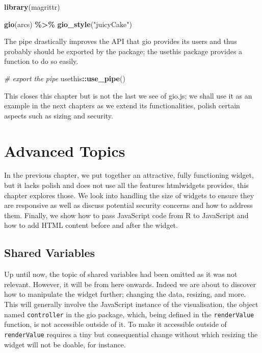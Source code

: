 \documentclass[
  10pt,
]{krantz}
\makeatletter
\newenvironment{Shaded}{\begin{snugshade}}{\end{snugshade}}
\newcommand{\CommentTok}[1]{\textcolor[rgb]{0.37,0.37,0.37}{\textit{#1}}}
\newcommand{\KeywordTok}[1]{\textcolor[rgb]{0.27,0.27,0.27}{\textbf{#1}}}
\newcommand{\NormalTok}[1]{#1}
\newcommand{\OperatorTok}[1]{\textcolor[rgb]{0.43,0.43,0.43}{\textbf{#1}}}
\newcommand{\StringTok}[1]{\textcolor[rgb]{0.5,0.5,0.5}{#1}}
\newenvironment{kframe}{%
\medskip{}
\setlength{\fboxsep}{.8em}
 \def\at@end@of@kframe{}%
 \ifinner\ifhmode%
  \def\at@end@of@kframe{\end{minipage}}%
  \begin{minipage}{\columnwidth}%
 \fi\fi%
 \def\FrameCommand##1{\hskip\@totalleftmargin \hskip-\fboxsep
 \colorbox{shadecolor}{##1}\hskip-\fboxsep
     \hskip-\linewidth \hskip-\@totalleftmargin \hskip\columnwidth}%
 \MakeFramed {\advance\hsize-\width
   \@totalleftmargin\z@ \linewidth\hsize
   \@setminipage}}%
 {\par\unskip\endMakeFramed%
 \at@end@of@kframe}
\renewenvironment{Shaded}{\begin{kframe}}{\end{kframe}}
\makeatother
\begin{document}
\begin{Shaded}
\begin{Highlighting}[]
\KeywordTok{library}\NormalTok{(magrittr)}

\KeywordTok{gio}\NormalTok{(arcs) }\OperatorTok{\%>\%}\StringTok{ }
\StringTok{  }\KeywordTok{gio\_style}\NormalTok{(}\StringTok{"juicyCake"}\NormalTok{)}
\end{Highlighting}
\end{Shaded}

The pipe drastically improves the API that gio provides its users and thus probably should be exported by the package; the usethis package provides a function to do so easily.

\begin{Shaded}
\begin{Highlighting}[]
\CommentTok{\# export the pipe}
\NormalTok{usethis}\OperatorTok{::}\KeywordTok{use\_pipe}\NormalTok{()}
\end{Highlighting}
\end{Shaded}

This closes this chapter but is not the last we see of gio.js; we shall use it as an example in the next chapters as we extend its functionalities, polish certain aspects such as sizing and security.

\hypertarget{widgets-adv}{%
\chapter{Advanced Topics}\label{widgets-adv}}

In the previous chapter, we put together an attractive, fully functioning widget, but it lacks polish and does not use all the features htmlwidgets provides, this chapter explores those. We look into handling the size of widgets to ensure they are responsive as well as discuss potential security concerns and how to address them. Finally, we show how to pass JavaScript code from R to JavaScript and how to add HTML content before and after the widget.

\hypertarget{widgets-adv-shared}{%
\section{Shared Variables}\label{widgets-adv-shared}}

Up until now, the topic of shared variables had been omitted as it was not relevant. However, it will be from here onwards. Indeed we are about to discover how to manipulate the widget further; changing the data, resizing, and more. This will generally involve the JavaScript instance of the visualisation, the object named \texttt{controller} in the gio package, which, being defined in the \texttt{renderValue} function, is not accessible outside of it. To make it accessible outside of \texttt{renderValue} requires a tiny but consequential change without which resizing the widget will not be doable, for instance.
\end{document}
